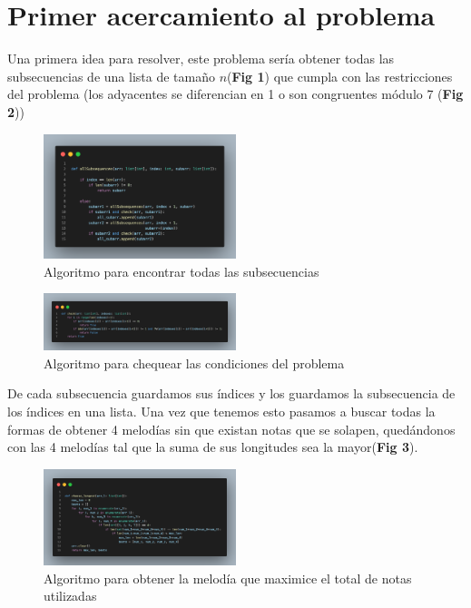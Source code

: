 \documentclass[sn-mathphys,Numbered]{sn-jnl}%
\theoremstyle{thmstyleone}%
\theoremstyle{thmstyletwo}%
\theoremstyle{thmstylethree}%
\begin{document}
\section{Primer acercamiento al problema}
Una primera idea para resolver, este problema ser\'ia obtener todas las subsecuencias de una lista de tama\~no $n$(\textbf{Fig 1}) que cumpla con las restricciones del problema (los adyacentes se diferencian en 1 o son congruentes m\'odulo 7 (\textbf{Fig 2}))\\
 \begin{figure}[htb]
        \centering
        \includegraphics[width=0.5\textwidth]{all_subsequence.png}
        \centering
        \caption{Algoritmo para encontrar todas las subsecuencias}
    \end{figure}

 \begin{figure}[htb]
        \centering
        \includegraphics[width=0.5\textwidth]{check.png}
        \centering
        \caption{Algoritmo para chequear las condiciones del problema}
    \end{figure}

De cada subsecuencia guardamos sus índices y los guardamos la subsecuencia de los índices en una lista.
Una vez que tenemos esto pasamos a buscar todas la formas de obtener 4 melod\'ias sin que existan notas que se solapen, quedándonos con las 4 melod\'ias tal que la suma de sus longitudes sea la mayor(\textbf{Fig 3}).

 \begin{figure}[htb]
        \centering
        \includegraphics[width=0.5\textwidth]{choose_longest.png}
        \centering
        \caption{Algoritmo para obtener la melod\'ia que maximice el total de notas utilizadas}
    \end{figure}
\end{document}
